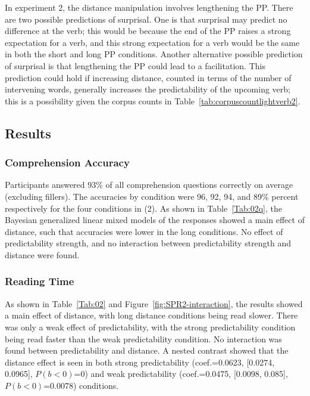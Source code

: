 \documentclass{frontiersSCNS}\usepackage{knitr} %
\begin{document}
In experiment 2, the distance manipulation involves lengthening the PP. There are two possible predictions of surprisal. One is that
surprisal may predict no difference at the verb; this would be because the end of the PP raises a strong expectation for a verb, and this strong expectation for a verb would be the same in both the short and long PP conditions. Another alternative possible prediction of surprisal is that lengthening the PP could lead to a facilitation. This prediction could hold if increasing distance, counted in terms of the number of intervening words, generally increases the predictability of the upcoming verb; this is a possibility given the corpus counts in Table~\ref{tab:corpuscountlightverb2}.



\subsection{Results}
\subsubsection{Comprehension Accuracy}

Participants answered 93\% of all comprehension questions correctly on average (excluding fillers). The accuracies by condition were 
96, 
92, 
94, and
89\% 
percent respectively for the four conditions in (2). 
As shown in Table~\ref{Tab:02q}, 
the Bayesian generalized linear mixed models of the responses showed a main effect of distance,
such that accuracies were lower in the long conditions. No effect of predictability strength, and no interaction between predictability strength and distance were found. 


\subsubsection{Reading Time}
As shown in Table~\ref{Tab:02} and Figure~\ref{fig:SPR2-interaction}, 
the results showed a main effect of distance, with long distance conditions being read slower. There was only a weak effect of predictability, with the strong predictability condition being read faster than the weak predictability condition. No interaction was found between predictability and distance. A nested contrast showed that the distance effect is seen in both  strong predictability 
(coef.=0.0623, [0.0274, 0.0965], $P(b<0)$=0)
and weak predictability 
(coef.=0.0475, [0.0098, 0.085], $P(b<0)$=0.0078)
conditions. 
\end{document}
